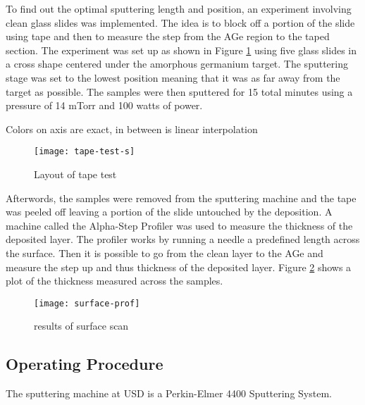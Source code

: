To find out the optimal sputtering length and position, an experiment involving clean glass slides was implemented.
The idea is to block off a portion of the slide using tape and then to measure the step from the AGe region to the taped section.
The experiment was set up as shown in Figure \ref{fig:tape-test-s} using five glass slides in a cross shape centered under the amorphous germanium target.
The sputtering stage was set to the lowest position meaning that it was as far away from the target as possible.
The samples were then sputtered for 15 total minutes using a pressure of 14 mTorr and 100 watts of power.

Colors on axis are exact, in between is linear interpolation 
\begin{figure}[htpb]
\centering
\texttt{[image: tape-test-s]}
\caption{Layout of tape test}
\label{fig:tape-test-s}
\end{figure}

Afterwords, the samples were removed from the sputtering machine and the tape was peeled off leaving a portion of the slide untouched by the deposition.
A machine called the Alpha-Step Profiler was used to measure the thickness of the deposited layer.
The profiler works by running a needle a predefined length across the surface.
Then it is possible to go from the clean layer to the AGe and measure the step up and thus thickness of the deposited layer.
Figure \ref{fig:surface-prof} shows a plot of the thickness measured across the samples.
\begin{figure}[htpb]
\centering
\texttt{[image: surface-prof]}
\caption{results of surface scan}
\label{fig:surface-prof}
\end{figure}

\subsection{Operating Procedure}
The sputtering machine at USD is a Perkin-Elmer 4400 Sputtering System.

